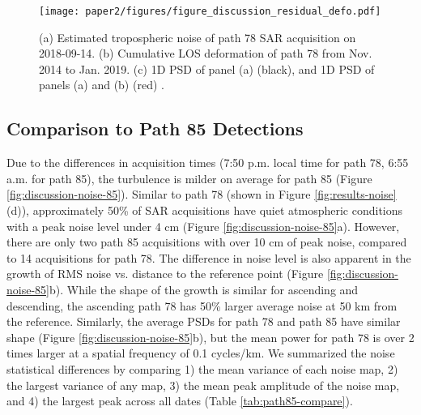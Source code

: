 \documentclass{utexasthesis}
\begin{document}
\begin{figure}[hbt!]
\centering 
\texttt{[image: paper2/figures/figure\_discussion\_residual\_defo.pdf]}
\caption{
(a) Estimated tropospheric noise of path 78 SAR acquisition on 2018-09-14. 
(b) Cumulative LOS deformation of path 78 from Nov. 2014 to Jan. 2019.
(c) 1D PSD of panel (a) (black), and 1D PSD of panels (a) and (b) (red) .
}
\label{fig:discussion-residual-defo}
\end{figure}


\subsection{Comparison to Path 85 Detections}
\label{subsec:discussion-path85}

Due to the differences in acquisition times (7:50 p.m. local time for path 78, 6:55 a.m. for path 85), the turbulence is milder on average for path 85 (Figure \ref{fig:discussion-noise-85}). Similar to path 78 (shown in Figure \ref{fig:results-noise}(d)), approximately 50\% of SAR acquisitions have quiet atmospheric conditions with a peak noise level under 4 cm (Figure \ref{fig:discussion-noise-85}a). However, there are only two path 85 acquisitions with over 10 cm of peak noise, compared to 14 acquisitions for path 78. The difference in noise level is also apparent in the growth of RMS noise vs. distance to the reference point (Figure \ref{fig:discussion-noise-85}b). While the shape of the growth is similar for ascending and descending, the ascending path 78 has 50\% larger average noise at 50 km from the reference. Similarly, the average PSDs for path 78 and path 85 have similar shape (Figure \ref{fig:discussion-noise-85}b), but the mean power for path 78 is over 2 times larger at a spatial frequency of 0.1 cycles/km. We summarized the noise statistical differences by comparing 1) the mean variance of each noise map, 2) the largest variance of any map, 3) the mean peak amplitude of the noise map, and 4) the largest peak across all dates (Table \ref{tab:path85-compare}).
\end{document}
